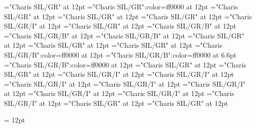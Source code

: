 \documentclass[a4paper]{article}
\begin{document}
\pagestyle{plain}
\sloppy
\setlength{\parfillskip}{0pt plus 1fil}
\font\spanen="Charis SIL/GR" at 12pt
\font\spanur="Charis SIL/GR":color=ff0000 at 12pt
\font\diven="Charis SIL/GR" at 12pt
\font\divur="Charis SIL/GR" at 12pt
\font\xitemxitemdefinitionbefore="Charis SIL/GR" at 12pt
\font\xitemxitemexamplebefore="Charis SIL/GR/I" at 12pt
\font\xitemxitemexamplesbefore="Charis SIL/GR" at 12pt
\font\xitemxitemheadwordbefore="Charis SIL/GR/B" at 12pt
\font\xitemxitemheadwordminorbefore="Charis SIL/GR/B" at 12pt
\font\xitemxitemLexEntrypublishRootMinorPrimaryTargetHeadWordRefbefore="Charis SIL/GR/B" at 12pt
\font\xitemxitemlexreftargetsbefore="Charis SIL/GR" at 12pt
\font{}="Charis SIL/GR" at 12pt
\font\entryletDatadicBody="Charis SIL/GR" at 12pt
\font\headwordurentryletDatadicBody="Charis SIL/GR/B":color=ff0000 at 12pt
\font\xhomographnumberheadwordurentryletDatadicBody="Charis SIL/GR/B":color=ff0000 at 6.6pt
\font\spanenheadwordurentryletDatadicBody="Charis SIL/GR/B":color=ff0000 at 12pt
\font\sensesentryletDatadicBody="Charis SIL/GR" at 12pt
\font\sensesensesentryletDatadicBody="Charis SIL/GR" at 12pt
\font\grammaticalinfosensesensesentryletDatadicBody="Charis SIL/GR/I" at 12pt
\font\partofspeechengrammaticalinfosensesensesentryletDatadicBody="Charis SIL/GR/I" at 12pt
\font\spanenpartofspeechengrammaticalinfosensesensesentryletDatadicBody="Charis SIL/GR/I" at 12pt
\font\slotsgrammaticalinfosensesensesentryletDatadicBody="Charis SIL/GR/I" at 12pt
\font\spanenslotsgrammaticalinfosensesensesentryletDatadicBody="Charis SIL/GR/I" at 12pt
\font\slotnameenslotsgrammaticalinfosensesensesentryletDatadicBody="Charis SIL/GR/I" at 12pt
\font\spanenslotnameenslotsgrammaticalinfosensesensesentryletDatadicBody="Charis SIL/GR/I" at 12pt
\font\spanengrammaticalinfosensesensesentryletDatadicBody="Charis SIL/GR/I" at 12pt
\font{}="Charis SIL/GR" at 12pt
\font\spanendefinitionensensesensesentryletDatadicBody="Charis SIL/GR" at 12pt

\mbox{} 
\newpage 
\newpage 
\setcounter{page}{1} 
\pagestyle{fancy} 
\setlength{\columnsep}{1.5em} 
\setlength\columnseprule{0.4pt} 
\begin{multicols}{2}{\raggedleft} \begin{spacing}{1.5}
\hangindent= 12pt
  \spanenslotsgrammaticalinfosensesensesentryletDatadicBody{: }  \end{spacing}
 \end{multicols}
\end{document}

